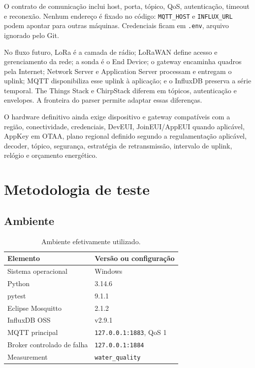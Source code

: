 \documentclass[12pt,a4paper]{article}
\newcommand{\code}[1]{\texttt{#1}}
\begin{document}
O contrato de comunicação inclui host, porta, tópico, QoS, autenticação, timeout e reconexão. Nenhum endereço é fixado no código: \code{MQTT\_HOST} e \code{INFLUX\_URL} podem apontar para outras máquinas. Credenciais ficam em \code{.env}, arquivo ignorado pelo Git.

No fluxo futuro, LoRa é a camada de rádio; LoRaWAN define acesso e gerenciamento da rede; a sonda é o End Device; o gateway encaminha quadros pela Internet; Network Server e Application Server processam e entregam o uplink; MQTT disponibiliza esse uplink à aplicação; e o InfluxDB preserva a série temporal. The Things Stack e ChirpStack diferem em tópicos, autenticação e envelopes. A fronteira do parser permite adaptar essas diferenças.

O hardware definitivo ainda exige dispositivo e gateway compatíveis com a região, conectividade, credenciais, DevEUI, JoinEUI/AppEUI quando aplicável, AppKey em OTAA, plano regional definido segundo a regulamentação aplicável, decoder, tópico, segurança, estratégia de retransmissão, intervalo de uplink, relógio e orçamento energético.

\section{Metodologia de teste}

\subsection{Ambiente}

\begin{table}[htbp]
\centering
\caption{Ambiente efetivamente utilizado.}
\begin{tabular}{ll}
\toprule
Elemento & Versão ou configuração \\
\midrule
Sistema operacional & Windows \\
Python & 3.14.6 \\
pytest & 9.1.1 \\
Eclipse Mosquitto & 2.1.2 \\
InfluxDB OSS & v2.9.1 \\
MQTT principal & \code{127.0.0.1:1883}, QoS 1 \\
Broker controlado de falha & \code{127.0.0.1:1884} \\
Measurement & \code{water\_quality} \\
\bottomrule
\end{tabular}
\end{table}
\end{document}
